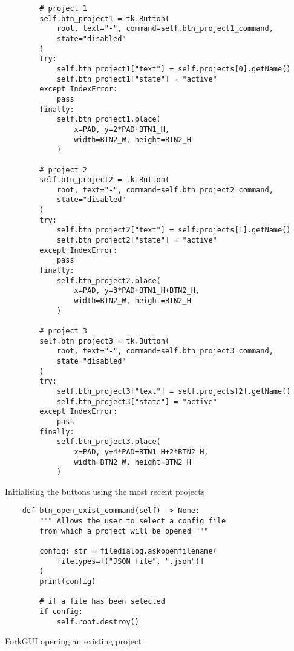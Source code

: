 \newpage
\begin{listing}[!ht]
    \begin{verbatim}
        # project 1
        self.btn_project1 = tk.Button(
            root, text="-", command=self.btn_project1_command, 
            state="disabled"
        )
        try:
            self.btn_project1["text"] = self.projects[0].getName()
            self.btn_project1["state"] = "active"
        except IndexError:
            pass
        finally:
            self.btn_project1.place(
                x=PAD, y=2*PAD+BTN1_H, 
                width=BTN2_W, height=BTN2_H
            ) 
        
        # project 2
        self.btn_project2 = tk.Button(
            root, text="-", command=self.btn_project2_command, 
            state="disabled"
        )
        try:
            self.btn_project2["text"] = self.projects[1].getName()
            self.btn_project2["state"] = "active"
        except IndexError:
            pass
        finally:
            self.btn_project2.place(
                x=PAD, y=3*PAD+BTN1_H+BTN2_H, 
                width=BTN2_W, height=BTN2_H
            )
            
        # project 3
        self.btn_project3 = tk.Button(
            root, text="-", command=self.btn_project3_command, 
            state="disabled"
        )
        try:
            self.btn_project3["text"] = self.projects[2].getName()
            self.btn_project3["state"] = "active"
        except IndexError:
            pass
        finally:
            self.btn_project3.place(
                x=PAD, y=4*PAD+BTN1_H+2*BTN2_H, 
                width=BTN2_W, height=BTN2_H
            )
    \end{verbatim}
    \caption{Initialising the buttons using the most recent projects}
    \label{sc:buttons-with-fileq}
\end{listing}

\newpage
\begin{listing}[!ht]
    \begin{verbatim}
    def btn_open_exist_command(self) -> None:
        """ Allows the user to select a config file
        from which a project will be opened """
        
        config: str = filedialog.askopenfilename(
            filetypes=[("JSON file", ".json")]
        )
        print(config)
        
        # if a file has been selected
        if config:
            self.root.destroy()
    \end{verbatim}
    \caption{ForkGUI opening an existing project}
    \label{sc:forkgui-open-existing-method}
\end{listing}

